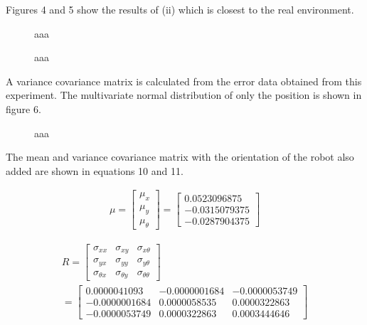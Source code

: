 \documentclass[a4paper]{article}
\begin{document}
Figures 4 and 5 show the results of (ii) which is closest to the real environment.

\begin{figure}[H]
    \centerline{}
    \caption{aaa}
    \centerline{}
    \caption{aaa}
\end{figure}

A variance covariance matrix is ​​calculated from the error data obtained from this experiment. 
The multivariate normal distribution of only the position is shown in figure 6.
\begin{figure}[H]
    \centerline{}
    \caption{aaa}
\end{figure}

The mean and variance covariance matrix with the orientation of the robot 
also added are shown in equations 10 and 11.

\begin{equation}
    \begin{split}
     \mu = 
     \begin{bmatrix}
        \mu_x \\
        \mu_y \\
        \mu_\theta
     \end{bmatrix}
     =
     \begin{bmatrix}
        0.0523096875 \\
        -0.0315079375 \\
        -0.0287904375
     \end{bmatrix}
    \end{split}
    \label{eq:10} 
\end{equation}

\begin{equation}
    \begin{split}
    R = 
    \begin{bmatrix}
        \sigma_{xx} &\sigma_{xy} &\sigma_{x\theta} \\
        \sigma_{yx} &\sigma_{yy} &\sigma_{y\theta} \\
        \sigma_{\theta x} &\sigma_{\theta y} &\sigma_{\theta\theta}
    \end{bmatrix} \\
    = 
    \begin{bmatrix}
        0.0000041093 & -0.0000001684 & -0.0000053749 \\
        -0.0000001684 & 0.0000058535 & 0.0000322863 \\
        -0.0000053749 & 0.0000322863 & 0.0003444646 
    \end{bmatrix} 
    \end{split}
    \label{eq:11} 
\end{equation}
\end{document}
